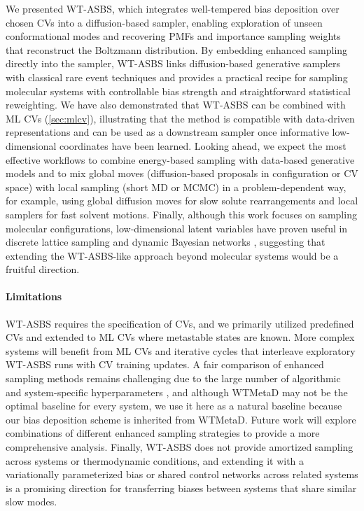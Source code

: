 \documentclass[]{fairmeta}
\theoremstyle{remark}
\begin{document}
We presented WT-ASBS, which integrates well-tempered bias deposition over chosen CVs into a diffusion-based sampler, enabling exploration of unseen conformational modes and recovering PMFs and importance sampling weights that reconstruct the Boltzmann distribution.
By embedding enhanced sampling directly into the sampler, WT-ASBS links diffusion-based generative samplers with classical rare event techniques and provides a practical recipe for sampling molecular systems with controllable bias strength and straightforward statistical reweighting.
We have also demonstrated that WT-ASBS can be combined with ML CVs (\cref{sec:mlcv}), illustrating that the method is compatible with data-driven representations and can be used as a downstream sampler once informative low-dimensional coordinates have been learned.
Looking ahead, we expect the most effective workflows to combine energy-based sampling with data-based generative models and to mix global moves (diffusion-based proposals in configuration or CV space) with local sampling (short MD or MCMC) in a problem-dependent way, for example, using global diffusion moves for slow solute rearrangements and local samplers for fast solvent motions.
Finally, although this work focuses on sampling molecular configurations, low-dimensional latent variables have proven useful in discrete lattice sampling \citep{swendsen1987nonuniversal,wang2001efficient} and dynamic Bayesian networks \citep{doucet2000rao}, suggesting that extending the WT-ASBS-like approach beyond molecular systems would be a fruitful direction.

\paragraph{Limitations}
WT-ASBS requires the specification of CVs, and we primarily utilized predefined CVs and extended to ML CVs where metastable states are known.
More complex systems will benefit from ML CVs and iterative cycles that interleave exploratory WT-ASBS runs with CV training updates.
A fair comparison of enhanced sampling methods remains challenging due to the large number of algorithmic and system-specific hyperparameters \citep{henin2022enhanced}, and although WTMetaD may not be the optimal baseline for every system, we use it here as a natural baseline because our bias deposition scheme is inherited from WTMetaD.
Future work will explore combinations of different enhanced sampling strategies to provide a more comprehensive analysis.
Finally, WT-ASBS does not provide amortized sampling across systems or thermodynamic conditions, and extending it with a variationally parameterized bias \citep{bonati2019neural} or shared control networks across related systems is a promising direction for transferring biases between systems that share similar slow modes.
\end{document}
